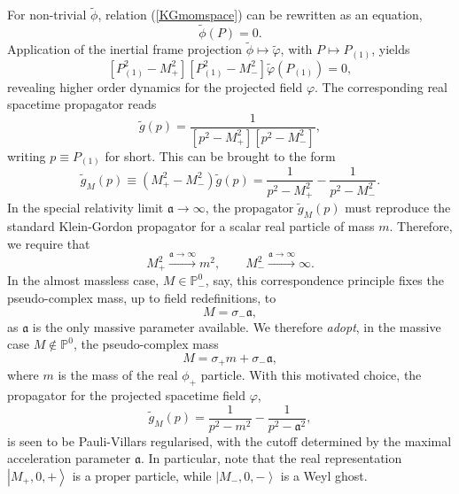\documentclass[a4paper,aps,prd,showkeys,showpacs,superscriptaddress,preprint]{revtex4}
\newcommand{\pc}{\mathbb{P}}
\begin{document}
For non-trivial $\tilde \phi$, relation (\ref{KGmomspace}) can be rewritten as
an equation,
\begin{equation}
  [P_+^2 - M_+^2][P_-^2 - M_-^2] \tilde \phi(P) = 0.
\end{equation}
Application of the inertial frame projection $\tilde \phi \mapsto \tilde
\varphi$, with $P \mapsto P_{(1)}$, yields
\begin{equation}\label{projectedtheory}
  [P_{(1)}^2 - M_+^2][P_{(1)}^2 - M_-^2] \tilde\varphi(P_{(1)}) = 0,
\end{equation}
revealing higher order dynamics for the projected field $\varphi$. The
corresponding real spacetime propagator reads
\begin{equation}
  \tilde g(p) = \frac{1}{[p^2 - M_+^2][p^2 - M_-^2]},
\end{equation} 
writing $p\equiv P_{(1)}$ for short. This can be brought to the form
\begin{equation}\label{PVprop}
  \tilde g_M(p) \equiv (M_+^2-M_-^2) \tilde g(p) = \frac{1}{p^2-M_+^2}
  - \frac{1}{p^2 - M_-^2}.
\end{equation}
In the special relativity limit $\mathfrak{a} \longrightarrow \infty$,
the propagator 
$\tilde g_M(p)$ must reproduce the standard Klein-Gordon propagator
for a scalar real particle of mass $m$. Therefore, we require that
\begin{equation}
  M_+^2 \stackrel{\mathfrak{a}\rightarrow \infty}{\longrightarrow} m^2,
  \qquad M_-^2 \stackrel{\mathfrak{a}\rightarrow \infty}{\longrightarrow} \infty.\end{equation}
In the almost massless case, $M\in\pc^0_-$, say, this correspondence
  principle fixes the pseudo-complex mass, up to field redefinitions, to
\begin{equation}
  M = \sigma_- \mathfrak{a},
\end{equation} 
as $\mathfrak{a}$ is the only massive parameter available. We therefore \textsl{adopt}, in the massive case
$M\not\in\pc^0$, the pseudo-complex mass
\begin{equation}
  M = \sigma_+ m + \sigma_- \mathfrak{a},
\end{equation}
where $m$ is the mass of the real $\phi_+$ particle. With this
motivated choice, the propagator
for the projected spacetime field $\varphi$,
\begin{equation}
  \tilde g_M(p) = \frac{1}{p^2-m^2} - \frac{1}{p^2-\mathfrak{a}^2},
\end{equation}
is seen to be Pauli-Villars regularised, with the cutoff determined by
the maximal acceleration parameter $\mathfrak{a}$. In particular, note 
that the real representation $\left|M_+,0,+\right>$ is a proper particle, 
while $\left|M_-,0,-\right>$ is a Weyl ghost.\\
\end{document}
